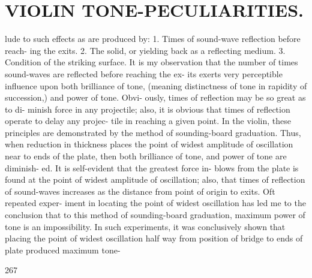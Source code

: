 \documentclass{article}
\begin{document}
\section*{VIOLIN TONE-PECULIARITIES.}
lude to such effects as are produced by: 1. Times of sound-wave reflection before reach- ing the exits. 2. The solid, or yielding back as a reflecting medium. 3. Condition of the striking surface. It is my observation that the number of times sound-waves are reflected before reaching the ex- its exerts very perceptible influence upon both brilliance of tone, (meaning distinctness of tone in rapidity of succession,) and power of tone. Obvi- ously, times of reflection may be so great as to di- minish force in any projectile; also, it is obvious that times of reflection operate to delay any projec- tile in reaching a given point. In the violin, these principles are demonstrated by the method of sounding-board graduation. Thus, when reduction in thickness places the point of widest amplitude of oscillation near to ends of the plate, then both brilliance of tone, and power of tone are diminish- ed. It is self-evident that the greatest force in- blows from the plate is found at the point of widest amplitude of oscillation; also, that times of reflection of sound-waves increases as the distance from point of origin to exits. Oft repeated exper- iment in locating the point of widest oscillation has led me to the conclusion that to this method of sounding-board graduation, maximum power of tone is an impossibility. In such experiments, it was conclusively shown that placing the point of widest oscillation half way from position of bridge to ends of plate produced maximum tone-

267
\end{document}
